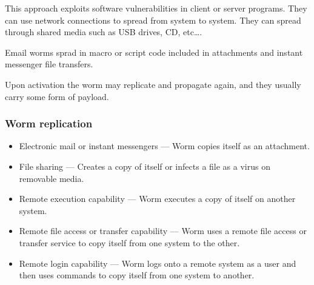 This approach exploits software vulnerabilities in client or server programs. They can use network connections to spread from system to system.
They can spread through shared media such as USB drives, CD, etc\ldots.

Email worms sprad in macro or script code included in attachments and instant messenger file transfers.

Upon activation the worm may replicate and propagate again, and they usually carry some form of payload.

\subsubsection{Worm replication}
\begin{itemize}
    \item Electronic mail or instant messengers --- Worm copies itself as an attachment.
    \item File sharing --- Creates a copy of itself or infects a file as a virus on removable media.
    \item Remote execution capability --- Worm executes a copy of itself on another system.
    \item Remote file access or transfer capability --- Worm uses a remote file access or transfer service to copy itself from one system to the other.
    \item Remote login capability --- Worm logs onto a remote system as a user and then uses commands to copy itself from one system to another.
\end{itemize}

